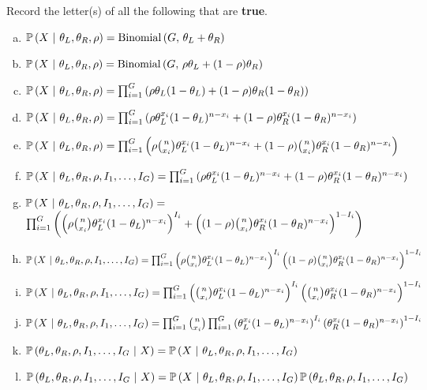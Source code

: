 \documentclass[12pt]{article}
\newcommand{\recordletters}{\small Record the letter(s) of all the following that are \textbf{true}. \normalsize}
\begin{document}
\benum{} \recordletters

\begin{enumerate}[(a)]
\item $\mathbb{P}\left(X~|~\theta_L, \theta_R, \rho\right) = \mathrm{Binomial}\left(G,\,\theta_L + \theta_R\right)$
\item $\mathbb{P}\left(X~|~\theta_L, \theta_R, \rho\right) = \mathrm{Binomial}\left(G,\,\rho\theta_L + (1-\rho)\theta_R\right)$
\item $\mathbb{P}\left(X~|~\theta_L, \theta_R, \rho\right) = \prod_{i=1}^G \left(\rho\theta_L (1 - \theta_L) + (1-\rho)\theta_R (1 - \theta_R)\right)$
\item $\mathbb{P}\left(X~|~\theta_L, \theta_R, \rho\right) = \prod_{i=1}^G \left(\rho\theta_L^{x_i} (1 - \theta_L)^{n - x_i} + (1-\rho)\theta_R^{x_i} (1 - \theta_R)^{n - x_i}\right)$
\item $\mathbb{P}\left(X~|~\theta_L, \theta_R, \rho\right) = \prod_{i=1}^G \left(\rho\binom{n}{x_i}\theta_L^{x_i} (1 - \theta_L)^{n - x_i} + (1-\rho) \binom{n}{x_i} \theta_R^{x_i} (1 - \theta_R)^{n - x_i}\right)$
\item $\mathbb{P}\left(X~|~\theta_L, \theta_R, \rho, I_1, \ldots, I_G\right) = \prod_{i=1}^G \left(\rho\theta_L^{x_i} (1 - \theta_L)^{n - x_i} + (1-\rho)\theta_R^{x_i} (1 - \theta_R)^{n - x_i}\right)$
\item $\mathbb{P}\left(X~|~\theta_L, \theta_R, \rho, I_1, \ldots, I_G\right) =$ \\ $\prod_{i=1}^G \left(\left(\rho \binom{n}{x_i} \theta_L^{x_i} (1 - \theta_L)^{n - x_i}\right)^{I_i} + \left((1-\rho) \binom{n}{x_i} \theta_R^{x_i} (1 - \theta_R)^{n - x_i}\right)^{1 - I_i}\right)$
\item $\mathbb{P}\left(X~|~\theta_L, \theta_R, \rho, I_1, \ldots, I_G\right) = \prod_{i=1}^G \left(\rho\binom{n}{x_i}\theta_L^{x_i} (1 - \theta_L)^{n - x_i}\right)^{I_i} \left((1-\rho)\binom{n}{x_i}\theta_R^{x_i} (1 - \theta_R)^{n - x_i}\right)^{1 - I_i}$
\item $\mathbb{P}\left(X~|~\theta_L, \theta_R, \rho, I_1, \ldots, I_G\right) = \prod_{i=1}^G \left(\binom{n}{x_i}\theta_L^{x_i} (1 - \theta_L)^{n - x_i}\right)^{I_i} \left(\binom{n}{x_i}\theta_R^{x_i} (1 - \theta_R)^{n - x_i}\right)^{1 - I_i}$
\item $\mathbb{P}\left(X~|~\theta_L, \theta_R, \rho, I_1, \ldots, I_G\right) = \prod_{i=1}^G \binom{n}{x_i} \prod_{i=1}^G \left(\theta_L^{x_i} (1 - \theta_L)^{n - x_i}\right)^{I_i} \left(\theta_R^{x_i} (1 - \theta_R)^{n - x_i}\right)^{1 - I_i}$
\item $\mathbb{P}\left(\theta_L, \theta_R, \rho, I_1, \ldots, I_G~|~X\right) = \mathbb{P}\left(X~|~\theta_L, \theta_R, \rho, I_1, \ldots, I_G\right)$
\item $\mathbb{P}\left(\theta_L, \theta_R, \rho, I_1, \ldots, I_G~|~X\right) = \mathbb{P}\left(X~|~\theta_L, \theta_R, \rho, I_1, \ldots, I_G\right)\mathbb{P}\left(\theta_L, \theta_R, \rho, I_1, \ldots, I_G\right)$

\end{enumerate}
\end{document}
